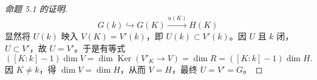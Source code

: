 \begin{proof}[命题 5.1 的证明]
\[G(k)\hookrightarrow G(K)\xrightarrow{u(K)}H(K)\]
显然将 $U(k)$ 映入 $V(K)=V'(k)$，即 $U(k)\subset V'(k)$。因 $U$ 且 $k$ 闭， $U\subset V'$，故 $U=V'$。于是有等式
\[([K:k]-1)\dim V=\dim\operatorname{Ker}(V'_K\to V)=\dim R=([K:k]-1)\dim H.\]
因 $K\ne k$，得 $\dim V=\dim H$，从而 $V=H$，最终 $U=V'=G$。
\end{proof}
